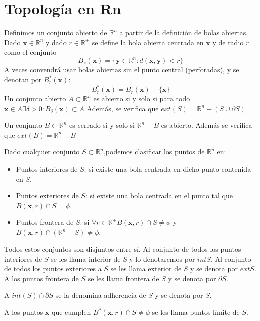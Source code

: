 \documentclass{../Calculo.tex}
\begin{document}
\section{Topología en Rn}
\begin{defin}

Definimos un conjunto abierto de $\mathbb{R}^n$ a partir de la definición de bolas abiertas.\\
Dado $\mathbf{x}\in \mathbb{R}^n$ y dado $r\in \mathbb{R}^+$ se define la bola abierta centrada en $\mathbf{x}$ y de radio $r$ como el conjunto
$$
B_{r}(\mathbf{x})=\{ \mathbf{y}\in \mathbb{R}^n: d(\mathbf{x},\mathbf{y}) < r \}
$$
A veces convendrá usar bolas abiertas sin el punto central (perforadas), y se denotan por $B_{r}^*(\mathbf{x})$:
$$
B_{r}^*(\mathbf{x})=B_{r}(\mathbf{x})- \{ \mathbf{x} \}
$$
Un conjunto abierto $A\subset \mathbb{R}^n$ es abierto si y solo si para todo $\mathbf{x}\in A \exists \delta >0 : B_{\delta}(\mathbf{x})\subset A$
Además, se verifica que $ext(S)=\mathbb{R}^{n}-(S\cup\partial S)$
\end{defin}
\begin{defin}
Un conjunto $B\subset \mathbb{R}^n$ es cerrado si y solo si
$\mathbb{R}^n-B$ es abierto.
Además se verifica que $ext(B)=\mathbb{R}^{n}-B$
\end{defin}
Dado cualquier conjunto $S\subset \mathbb{R}^n$,podemos clasificar los puntos de $\mathbb{R}^n$ en:
\begin{itemize}
	\item Puntos interiores de $S$: si existe una bola centrada en dicho punto contenida en $S$.
	\item Puntos exteriores de $S$: si existe una bola centrada en el punto tal que $B(\mathbf{x},r) \cap S = \phi$.
	\item Puntos frontera de $S$: si $\forall r\in \mathbb{R}^{+} B(\mathbf{x},r)\cap S \neq \phi$ y $B(\mathbf{x},r)\cap(\mathbb{R}^n-S)\neq \phi$.
\end{itemize}
Todos estos conjuntos son disjuntos entre sí. Al conjunto de todos los puntos interiores de $S$ se les llama interior de $S$ y lo denotaremos por $int S$. Al conjunto de todos los puntos exteriores a $S$ se les llama exterior de $S$ y se denota por $ext S$. A los puntos frontera de $S$ se les llama frontera de $S$ y se denota por $\partial S$.
\begin{defin}
A $int(S)\cap\partial S$ se la denomina adherencia de $S$ y se denota por $\bar{S}$.
\end{defin}
\begin{defin}
A los puntos $\mathbf{x}$ que cumplen $B^{*}(\mathbf{x},r)\cap S\neq \phi$ se les llama puntos límite de $S$.
\end{defin}
\end{document}
